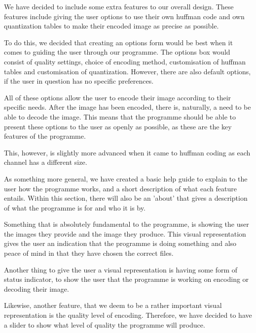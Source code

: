 We have decided to include some extra features to our overall design.
These features include giving the user options to use their own huffman code and own quantization tables to make their encoded image as precise as possible.

To do this, we decided that creating an options form would be best when it comes to guiding the user through our programme.
The options box would consist of quality settings, choice of encoding method, customisation of huffman tables and customisation of quantization.
However, there are also default options, if the user in question has no specific preferences.

All of these options allow the user to encode their image according to their specific needs.
After the image has been encoded, there is, naturally, a need to be able to decode the image.
This means that the programme should be able to present these options to the user as openly as possible, as these are the key features of the programme.

This, however, is slightly more advanced when it came to huffman coding as each channel has a different size.

As something more general, we have created a basic help guide to explain to the user how the programme works, and a short description of what each feature entails.
Within this section, there will also be an 'about' that gives a description of what the programme is for and who it is by.

Something that is absolutely fundamental to the programme, is showing the user the images they provide and the image they produce.
This visual representation gives the user an indication that the programme is doing something and also peace of mind in that they have chosen the correct files.

Another thing to give the user a visual representation is having some form of status indicator, to show the user that the programme is working on encoding or decoding their image.

Likewise, another feature, that we deem to be a rather important visual representation is the quality level of encoding.
Therefore, we have decided to have a slider to show what level of quality the programme will produce.

